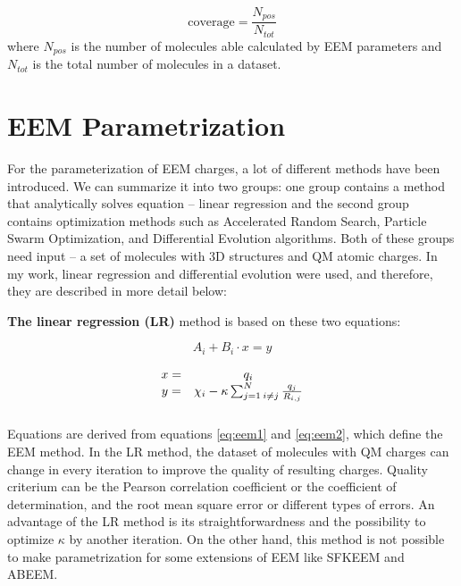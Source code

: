 \begin{equation}
    \mathrm{coverage} = \frac{N_{pos}}{N_{tot}}
\end{equation}
where $N_{pos}$ is the number of molecules able calculated by EEM parameters
and $N_{tot}$ is the total number of molecules in a dataset.

\section{EEM Parametrization}

For the parameterization of EEM charges, a lot of different methods have been
introduced. We can summarize it into two groups: one group contains
a method that analytically solves equation \cite{eq:eem} -- linear
regression \cite{Svobodova2007, Jirouskova2009} and the
second group contains optimization methods \cite{Ouyang2009}  such as
Accelerated Random Search, Particle Swarm Optimization, and Differential
Evolution algorithms. Both of these groups need input -- a set of molecules
with 3D structures and QM atomic charges. In my work, linear regression and
differential evolution were used, and therefore, they are described in more
detail below:

\textbf{The linear regression (LR)} method is based on these two equations:

\begin{equation} \label{eq:eem1}
    A_i + B_i \cdot x = y
\end{equation}

\begin{equation} \label{eq:eem2}
    \begin{array}{cc}
    x =& q_i \\
    \vspace{3mm}
    y =& \chi_i - \kappa \sum^N_{j=1 \: i\neq{j}} \frac{q_j}{R_{i,j}} \\
    \end{array}
\end{equation}

Equations are derived from equations \ref{eq:eem1} and \ref{eq:eem2}, which
define the EEM method. In the LR method, the dataset of molecules with QM
charges can change in every iteration to improve the quality of resulting
charges. Quality criterium can be the Pearson correlation coefficient or
the coefficient of determination, and the root mean square error or different
types of errors.  An advantage of the LR method is its straightforwardness and
the possibility to optimize $\kappa$ by another iteration. On the other hand,
this method is not possible to make parametrization for some extensions of EEM
like SFKEEM and ABEEM.

